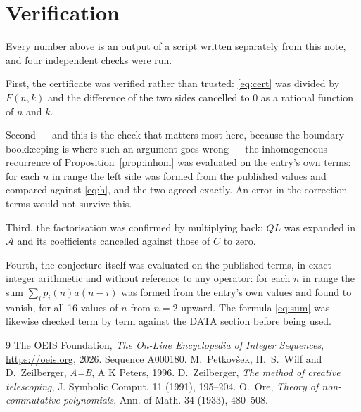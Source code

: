 \documentclass[11pt,a4paper]{article}
\theoremstyle{plain}
\theoremstyle{definition}
\begin{document}
\section{Verification}

Every number above is an output of a script written separately from this note, and four
independent checks were run.

First, the certificate was verified rather than trusted: \eqref{eq:cert} was divided by
$F(n,k)$ and the difference of the two sides cancelled to $0$ as a rational function of $n$
and $k$.

Second --- and this is the check that matters most here, because the boundary bookkeeping
is where such an argument goes wrong --- the inhomogeneous recurrence of
Proposition~\ref{prop:inhom} was evaluated on the entry's own terms: for each $n$ in range
the left side was formed from the published values and compared against \eqref{eq:h}, and
the two agreed exactly. An error in the correction terms would not survive this.

Third, the factorisation was confirmed by multiplying back: $QL$ was expanded in
$\mathcal{A}$ and its coefficients cancelled against those of $C$ to zero.

Fourth, the conjecture itself was evaluated on the published terms, in exact integer
arithmetic and without reference to any operator: for each $n$ in range the sum
$\sum_{i}p_{i}(n)a(n-i)$ was formed from the entry's own values and found to vanish, for
all 16 values of $n$ from $n=2$ upward. The formula \eqref{eq:sum} was
likewise checked term by term against the DATA section before being used.

\begin{thebibliography}{9}
 The OEIS Foundation, \emph{The On-Line Encyclopedia of Integer Sequences},
\url{https://oeis.org}, 2026. Sequence A000180.
 M.~Petkov\v{s}ek, H.~S.~Wilf and D.~Zeilberger, \emph{A=B}, A K Peters,
1996.
 D.~Zeilberger, \emph{The method of creative telescoping}, J. Symbolic
Comput. 11 (1991), 195--204.
 O.~Ore, \emph{Theory of non-commutative polynomials}, Ann. of Math. 34
(1933), 480--508.
\end{thebibliography}
\end{document}
